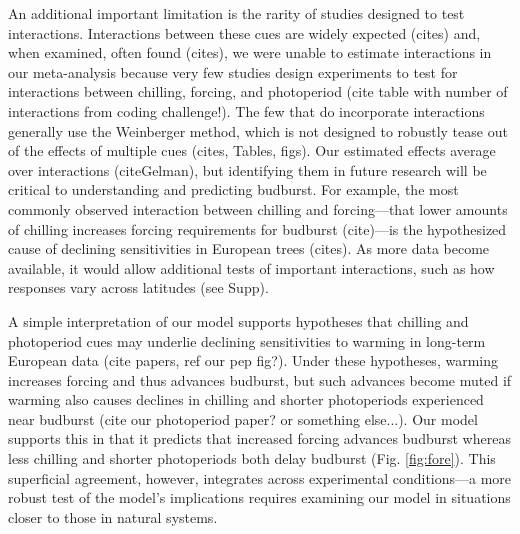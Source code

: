 \documentclass{article}
\begin{document}
\par An additional important limitation is the rarity of studies designed to test interactions. Interactions between these cues are widely expected (cites) and, when examined, often found (cites), we were unable to estimate interactions in our meta-analysis because very few studies design experiments to test for interactions between chilling, forcing, and photoperiod (cite table with number of interactions from coding challenge!). The few that do incorporate interactions generally use the Weinberger method, which is not designed to robustly tease out of the effects of multiple cues (cites, Tables, figs).  Our estimated effects average over interactions (citeGelman), but identifying them in future research will be critical to understanding and predicting budburst. For example, the most commonly observed interaction between chilling and forcing---that lower amounts of chilling increases forcing requirements for budburst (cite)---is the hypothesized cause of declining sensitivities in European trees (cites). As more data become available, it would allow additional tests of important interactions, such as how responses vary across latitudes (see Supp). %

\par A simple interpretation of our model supports hypotheses that chilling and photoperiod cues may underlie declining sensitivities to warming in long-term European data (cite papers, ref our pep fig?). Under these hypotheses, warming increases forcing and thus advances budburst, but such advances become muted if warming also causes declines in chilling and shorter photoperiods experienced near budburst (cite our photoperiod paper? or something else...). Our model supports this in that it predicts that increased forcing advances budburst whereas less chilling and shorter photoperiods both delay budburst (Fig. \ref{fig:fore}). This superficial agreement, however, integrates across experimental conditions---a more robust test of the model's implications requires examining our model in situations closer to those in natural systems.
\end{document}
